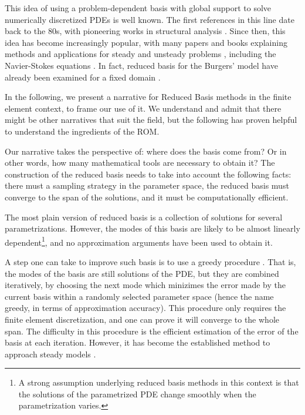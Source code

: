 This idea of using a problem-dependent basis with global support 
to solve numerically discretized PDEs
is well known.
The first references in this line date back to the 80s, 
with pioneering works in structural analysis \cite{1978firstRBStructuralAnalysis}.
Since then, this idea has become increasingly popular,
with many papers and books explaining methods and applications for steady and unsteady problems
\cite{Rozza2008, 
2005_aPosterioriErrorBoundsReducedBasisApproximationsParametrizedParabolicPde_Grepl,
2009_reducedBasisMethodsAPosterioriErrorEstimatorsHeatTransferProblems_Rozza,
2016_CertifiedReducedBasisMethodsParametrizedPDE_Hesthaven,
Quarteroni2016,
2017_modelReductionAndApproximation,
benner2017_book},
including the Navier-Stokes equations 
\cite{navierStokesReducedBasis}.
In fact, reduced basis for the Burgers' model have already been examined for a fixed domain
\cite{Nguyen2009}.

In the following,
we present a narrative for Reduced Basis methods in the finite element context,
to frame our use of it.
We understand and admit that there might be other narratives that suit the field,
but the following has proven helpful to understand the ingredients of the ROM.

Our narrative takes the perspective of: where does the basis come from?
Or in other words,
how many mathematical tools are necessary to obtain it?
The construction of the reduced basis needs to take into account the following facts:
there must a sampling strategy in the parameter space,
the reduced basis must converge to the span of the solutions,
and it must be computationally efficient.

The most plain version of reduced basis is 
a collection of solutions for several parametrizations.
However, the modes of this basis are likely to be almost linearly dependent\footnote{
    A strong assumption underlying reduced basis methods in this context
    is that the solutions of the parametrized PDE
    change smoothly when the parametrization varies.
},
and no approximation arguments have been used to obtain it.

A step one can take to improve such basis is to use a greedy procedure
\cite{Buffa2012APC, Veroy2003}.
That is, the modes of the basis are still solutions of the PDE, 
but they are combined iteratively,
by choosing the next mode which minizimes 
the error made by the current basis within a randomly selected parameter space
(hence the name greedy, in terms of approximation accuracy).
This procedure only requires the finite element discretization,
and one can prove it will converge to the whole span.
The difficulty in this procedure 
is the efficient estimation of the error
of the basis at each iteration.
However, it has become the established method to approach steady models \cite{Haasdonk2013}.

